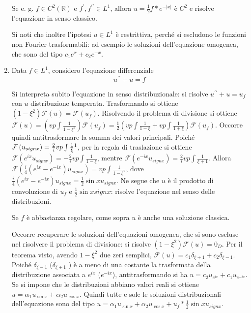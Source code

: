 \documentclass{article}
\begin{document}
\begin{enumerate}
Se e. g. $f\in C^{2}\left( 
\mathbb{R}
\right) $ e $f^{\prime },f^{\prime \prime }\in L^{1}$, allora $u=\frac{1}{2}%
f\ast e^{-\left\vert x\right\vert }$ \`{e} $C^{2}$ e risolve l'equazione in
senso classico.

Si noti che inoltre l'ipotesi $u\in L^{1}$ \`{e} restrittiva, perch\'{e} si
escludono le funzioni non Fourier-trasformabili: ad esempio le soluzioni
dell'equazione omogenea, che sono del tipo $c_{1}e^{x}+c_{2}e^{-x}$.

\item Data $f\in L^{1}$, considero l'equazione differenziale%
\begin{equation*}
u^{\prime \prime }+u=f
\end{equation*}

Si interpreta subito l'equazione in senso distribuzionale: si risolve $%
u^{\prime \prime }+u=u_{f}$ con $u$ distribuzione temperata. Trasformando si
ottiene $\left( 1-\xi ^{2}\right) \mathcal{F}\left( u\right) =\mathcal{F}%
\left( u_{f}\right) $. Risolvendo il problema di divisione si ottiene $%
\mathcal{F}\left( u\right) =\left( vp\int \frac{1}{1-\xi ^{2}}\right) 
\mathcal{F}\left( u_{f}\right) =\frac{1}{2}\left( vp\int \frac{1}{1-\xi }%
+vp\int \frac{1}{1+\xi }\right) \mathcal{F}\left( u_{f}\right) $. Occorre
quindi antitrasformare la somma dei valori principali. Poich\'{e} $\mathcal{F%
}\left( u_{signx}\right) =\frac{2}{i}vp\int \frac{1}{\xi }\footnote{%
si ottiene analogamente a quanto visto per la trasformata di $e^{-\left\vert
x\right\vert }$}$, per la regola di traslazione si ottiene $\mathcal{F}%
\left( e^{ix}u_{signx}\right) =-\frac{2}{i}vp\int \frac{1}{1-\xi }$, mentre $%
\mathcal{F}\left( e^{-ix}u_{signx}\right) =\frac{2}{i}vp\int \frac{1}{\xi +1}
$. Allora $\mathcal{F}\left( \frac{i}{4}\left( e^{ix}-e^{-ix}\right)
u_{signx}\right) =vp\int \frac{1}{1-\xi ^{2}}$, dove $\frac{i}{4}\left(
e^{ix}-e^{-ix}\right) u_{signx}=\frac{1}{2}\sin xu_{signx}$. Ne segue che $u$
\`{e} il prodotto di convoluzione di $u_{f}$ e $\frac{1}{2}\sin xsignx$:
risolve l'equazione nel senso delle distribuzioni.

Se $f$ \`{e} abbastanza regolare, come sopra $u$ \`{e} anche una soluzione
classica.

Occorre recuperare le soluzioni dell'equazioni omogenea, che si sono escluse
nel risolvere il problema di divisione: si risolve $\left( 1-\xi ^{2}\right) 
\mathcal{F}\left( u\right) =0_{D}$. Per il teorema visto, avendo $1-\xi ^{2}$
due zeri semplici, $\mathcal{F}\left( u\right) =c_{1}\delta _{\xi
+1}+c_{2}\delta _{\xi -1}$. Poich\'{e} $\delta _{\xi -1}$ ($\delta _{\xi +1}$%
) \`{e} a meno di una costante la trasformata della distribuzione associata
a $e^{ix}$ ($e^{-ix}$), antitrasformando si ha $%
u=c_{2}u_{e^{ix}}+c_{1}u_{e^{-ix}}$. Se si impone che le distribuzioni
abbiano valori reali si ottiene $u=\alpha _{1}u_{\sin x}+\alpha _{2}u_{\cos
x}$. Quindi tutte e sole le soluzioni distribuzionali dell'equazione sono
del tipo $u=\alpha _{1}u_{\sin x}+\alpha _{2}u_{\cos x}+u_{f}\ast \frac{1}{2}%
\sin xu_{signx}$.
\end{enumerate}
\end{document}
